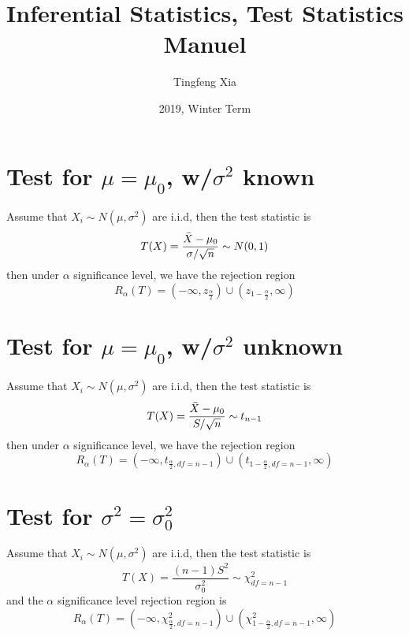 \documentclass{article}
\title{Inferential Statistics, Test Statistics Manuel}
\author{Tingfeng Xia}
\date{2019, Winter Term}
\begin{document}
\maketitle
\tableofcontents
\newpage
\section{Test for $\mu = \mu_0$, w/$\sigma^2$ known}
Assume that $X_i\sim N(\mu, \sigma^2)$ are i.i.d, then the test 
statistic is
\begin{equation*}
    T(X) = \frac{\Bar{X} - \mu_0}{\sigma / \sqrt{n}} \sim N(0, 1)
\end{equation*}
then under $\alpha$ significance level, we have the rejection region
\begin{equation*}
    R_\alpha(T) = ( -\infty, z_{\frac{\alpha}{2}} ) \cup 
(z_{1-\frac{\alpha}{2}}, \infty )
\end{equation*}

\section{Test for $\mu = \mu_0$, w/$\sigma^2$ unknown}
Assume that $X_i\sim N(\mu, \sigma^2)$ are i.i.d, then the test 
statistic is
\begin{equation*}
    T(X) = \frac{\Bar{X} - \mu_0}{S / \sqrt{n}} \sim t_{n-1}
\end{equation*}
then under $\alpha$ significance level, we have the rejection region
\begin{equation*}
    R_\alpha(T) = ( -\infty, t_{\frac{\alpha}{2}, df=n-1} ) \cup 
(t_{1-\frac{\alpha}{2}, df=n-1}, \infty )
\end{equation*}

\section{Test for $\sigma^2 = \sigma_0^2$}
Assume that $X_i\sim N(\mu, \sigma^2)$ are i.i.d, then the test 
statistic is
\begin{equation*}
    T(X) = \frac{(n-1)S^2}{\sigma_0^2} \sim \chi^2_{df = n-1}
\end{equation*}
and the $\alpha$ significance level rejection region is 
\begin{equation*}
    R_\alpha(T) = ( -\infty, \chi^2_{\frac{\alpha}{2}, df=n-1} ) \cup 
(\chi^2_{1-\frac{\alpha}{2}, df=n-1}, \infty )
\end{equation*}
\end{document}

